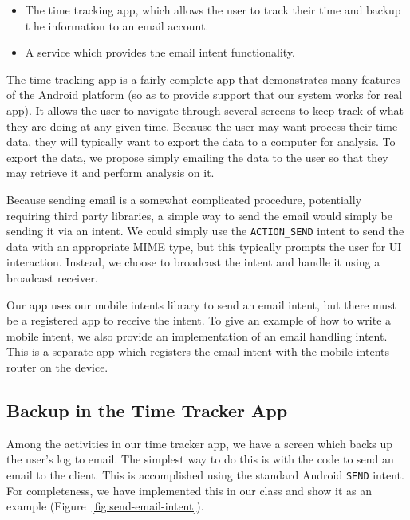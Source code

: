 \documentclass{acm_proc_article-sp}
\begin{document}
\begin{itemize}
\item The time tracking app, which allows the user to track their time
  and backup t he information to an email account.
\item A service which provides the email intent functionality.
\end{itemize}

The time tracking app is a fairly complete app that demonstrates many
features of the Android platform (so as to provide support that our
system works for real app).  It allows the user to navigate through
several screens to keep track of what they are doing at any given
time.  Because the user may want process their time data, they will
typically want to export the data to a computer for analysis.  To
export the data, we propose simply emailing the data to the user so
that they may retrieve it and perform analysis on it.  

Because sending email is a somewhat complicated procedure, potentially
requiring third party libraries, a simple way to send the email would
simply be sending it via an intent.  We could simply use the
\texttt{ACTION\_SEND} intent to send the data with an appropriate MIME
type, but this typically prompts the user for UI interaction.
Instead, we choose to broadcast the intent and handle it using a
broadcast receiver.

Our app uses our mobile intents library to send an email intent, but
there must be a registered app to receive the intent.  To give an
example of how to write a mobile intent, we also provide an
implementation of an email handling intent.  This is a separate app
which registers the email intent with the mobile intents router on the
device.

\subsection{Backup in the Time Tracker App}

Among the activities in our time tracker app, we have a screen which
backs up the user's log to email.  The simplest way to do this is with
the code to send an email to the client.  This is accomplished using
the standard Android \texttt{SEND} intent.  For completeness, we have
implemented this in our class and show it as an example
(Figure~\ref{fig:send-email-intent}).
\end{document}
